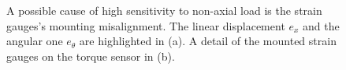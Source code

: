 \documentclass[journal]{IEEEtran}
\begin{document}
\begin{figure}[]
	\centering
	\caption{A possible cause of high sensitivity to non-axial load is the strain gauges's mounting misalignment. The linear displacement $e_x$ and the angular one $e_{\theta}$ are highlighted in (a). A detail of the mounted strain gauges on the torque sensor in (b).} 
\end{figure}
\end{document}
